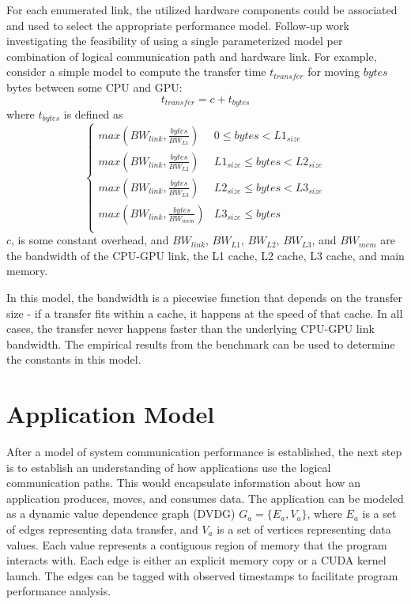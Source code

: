 For each enumerated link, the utilized hardware components could be associated and used to select the appropriate performance model.
Follow-up work investigating the feasibility of using a single parameterized model per combination of logical communication path and hardware link.
For example, consider a simple model to compute the transfer time $t_{transfer}$ for moving $bytes$ bytes between some CPU and GPU:
\[
    t_{transfer} = c + t_{bytes}
\]
where $t_{bytes}$ is defined as
\[ \begin{cases} 
    max(BW_{link}, \frac{bytes}{BW_{L1}}) & 0 \leq bytes < L1_{size} \\
    max(BW_{link}, \frac{bytes}{BW_{L2}}) & L1_{size} \leq bytes < L2_{size} \\
    max(BW_{link}, \frac{bytes}{BW_{L3}}) & L2_{size} \leq bytes < L3_{size} \\
    max(BW_{link}, \frac{bytes}{BW_{mem}}) & L3_{size} \leq bytes  \\
 \end{cases}
\]
$c$, is some constant overhead, and $BW_{link}$, $BW_{L1}$, $BW_{L2}$, $BW_{L3}$, and $BW_{mem}$ are the bandwidth of the CPU-GPU link, the L1 cache, L2 cache, L3 cache, and main memory.

In this model, the bandwidth is a piecewise function that depends on the transfer size - if a transfer fits within a cache, it happens at the speed of that cache.
In all cases, the transfer never happens faster than the underlying CPU-GPU link bandwidth.
The empirical results from the benchmark can be used to determine the constants in this model.

\section{Application Model}
\label{sec:app-model}

After a model of system communication performance is established, the next step is to establish an understanding of how applications use the logical communication paths.
This would encapsulate information about how an application produces, moves, and consumes data.
The application can be modeled as a dynamic value dependence graph (DVDG) $G_a = \{E_a,V_a\}$, where $E_a$ is a set of edges representing data transfer, and $V_a$ is a set of vertices representing data values.
Each value represents a contiguous region of memory that the program interacts with.
Each edge is either an explicit memory copy or a CUDA kernel launch.
The edges can be tagged with observed timestamps to facilitate program performance analysis.


